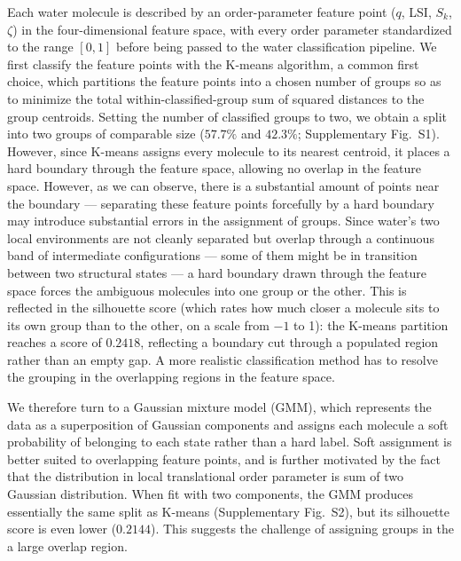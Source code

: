 \documentclass[aps, amsmath,amssymb, reprint, twocolumn, superscriptaddress]{revtex4-2}
\begin{document}
Each water molecule is described by an order-parameter feature point ($q$, LSI, $S_k$, $\zeta$) in the four-dimensional feature space, with every order parameter standardized to the range $[0,1]$ before being passed to the water classification pipeline. We first classify the feature points with the K-means algorithm\cite{lloyd_least_1982,macqueen_methods_1967,ikotun_k-means_2023}, a common first choice, which partitions the feature points into a chosen number of groups so as to minimize the total within-classified-group sum of squared distances to the group centroids. Setting the number of classified groups to two, we obtain a split into two groups of comparable size ($57.7\%$ and $42.3\%$; Supplementary Fig.~S1). However, since K-means assigns every molecule to its nearest centroid, it places a hard boundary through the feature space, allowing no overlap in the feature space. However, as we can observe, there is a substantial amount of points near the boundary --- separating these feature points forcefully by a hard boundary may introduce substantial errors in the assignment of groups. Since water's two local environments are not cleanly separated but overlap through a continuous band of intermediate configurations --- some of them might be in transition between two structural states --- a hard boundary drawn through the feature space forces the ambiguous molecules into one group or the other. This is reflected in the silhouette score\cite{rousseeuw_silhouettes_1987} (which rates how much closer a molecule sits to its own group than to the other, on a scale from $-1$ to 1): the K-means partition reaches a score of $0.2418$, reflecting a boundary cut through a populated region rather than an empty gap. A more realistic classification method has to resolve the grouping in the overlapping regions in the feature space.  

We therefore turn to a Gaussian mixture model (GMM), which represents the data as a superposition of Gaussian components and assigns each molecule a soft probability of belonging to each state rather than a hard label\cite{deprez-2024,dempster_maximum_1977}. Soft assignment is better suited to overlapping feature points, and is further motivated by the fact that the distribution in local translational order parameter is sum of two Gaussian distribution\cite{shi_direct_2020}. When fit with two components, the GMM produces essentially the same split as K-means (Supplementary Fig.~S2), but its silhouette score is even lower ($0.2144$). This suggests the challenge of assigning groups in the a large overlap region. 
\end{document}
